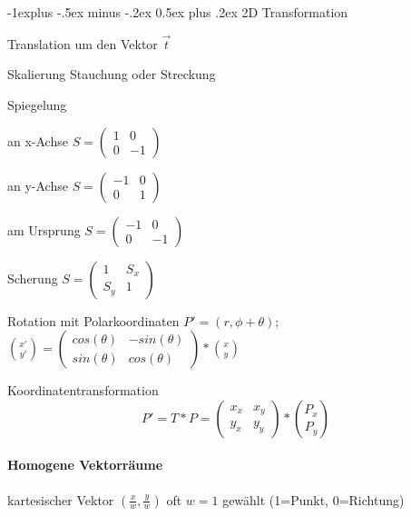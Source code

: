 \documentclass[landscape]{article}
\makeatletter
\renewcommand{\subsection}{\@startsection{subsection}{2}{0mm}%
                                {-1explus -.5ex minus -.2ex}%
                                {0.5ex plus .2ex}%
                                {\normalfont\normalsize\bfseries}}
\makeatother
\begin{document}
\begin{multicols}{3}
  \subsection{2D Transformation}
  \begin{description*}
    \item[Translation] um den Vektor $\vec{t}$
    \item[Skalierung] Stauchung oder Streckung
    \item[Spiegelung]
          \begin{itemize*}
            \item an x-Achse $S=\begin{pmatrix} 1 & 0 \\ 0 & -1 \end{pmatrix}$
            \item an y-Achse $S=\begin{pmatrix} -1 & 0 \\ 0 & 1 \end{pmatrix}$
            \item am Ursprung $S=\begin{pmatrix} -1 & 0 \\ 0 & -1 \end{pmatrix}$
          \end{itemize*}
    \item[Scherung] $S=\begin{pmatrix} 1 & S_x \\ S_y & 1 \end{pmatrix}$
    \item[Rotation mit Polarkoordinaten] $P'=(r,\phi+\theta)$; $\binom{x'}{y'}=\begin{pmatrix} cos(\theta) & -sin(\theta) \\ sin(\theta) & cos(\theta)\end{pmatrix}*\binom{x}{y}$
    \item[Koordinatentransformation] $$P' =T*P = \begin{pmatrix} x_x & x_y\\ y_x & y_y \end{pmatrix} * \binom{P_x}{P_y}$$
  \end{description*}
  
  \paragraph{Homogene Vektorräume}
  kartesischer Vektor $(\frac{x}{w},\frac{y}{w})$ oft $w=1$ gewählt (1=Punkt, 0=Richtung)
  

\end{multicols}
\end{document}

